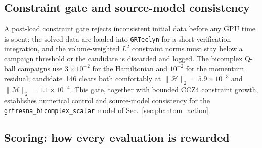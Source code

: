 \documentclass[twocolumn,floatfix,aps,prd,nofootinbib]{revtex4-2}
\begin{document}
\subsection{Constraint gate and source-model consistency}
\label{sec:selfconsistent}

A post-load constraint gate rejects inconsistent initial data before any GPU
time is spent: the solved data are loaded into \texttt{GRTeclyn} for a short
verification integration, and the volume-weighted $L^2$ constraint norms must
stay below a campaign threshold or the candidate is discarded and logged. The
bicomplex Q-ball campaigns use $3\times10^{-2}$ for the Hamiltonian and
$10^{-2}$ for the momentum residual; candidate~146 clears both comfortably at
$\|\mathcal H\|_2=5.9\times10^{-3}$ and
$\|\mathcal M\|_2=1.1\times10^{-4}$. This gate, together with bounded CCZ4
constraint growth, establishes numerical control and source-model consistency
for the \texttt{grtresna\_bicomplex\_scalar} model of
Sec.~\ref{sec:phantom_action}.

\subsection{Scoring: how every evaluation is rewarded}
\label{sec:scoring}
\end{document}
